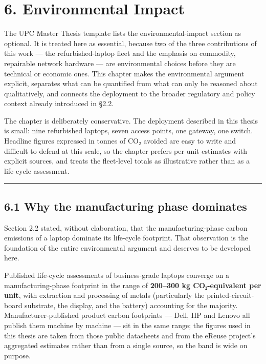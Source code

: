 \hypertarget{environmental-impact}{%
\section{6. Environmental Impact}\label{environmental-impact}}

The UPC Master Thesis template lists the environmental-impact section as
optional. It is treated here as essential, because two of the three
contributions of this work --- the refurbished-laptop fleet and the
emphasis on commodity, repairable network hardware --- are environmental
choices before they are technical or economic ones. This chapter makes
the environmental argument explicit, separates what can be quantified
from what can only be reasoned about qualitatively, and connects the
deployment to the broader regulatory and policy context already
introduced in §2.2.

The chapter is deliberately conservative. The deployment described in
this thesis is small: nine refurbished laptops, seven access points, one
gateway, one switch. Headline figures expressed in tonnes of CO₂ avoided
are easy to write and difficult to defend at this scale, so the chapter
prefers per-unit estimates with explicit sources, and treats the
fleet-level totals as illustrative rather than as a life-cycle
assessment.

\begin{center}\rule{0.5\linewidth}{0.5pt}\end{center}

\hypertarget{why-the-manufacturing-phase-dominates}{%
\subsection{6.1 Why the manufacturing phase
dominates}\label{why-the-manufacturing-phase-dominates}}

Section 2.2 stated, without elaboration, that the manufacturing-phase
carbon emissions of a laptop dominate its life-cycle footprint. That
observation is the foundation of the entire environmental argument and
deserves to be developed here.

Published life-cycle assessments of business-grade laptops converge on a
manufacturing-phase footprint in the range of \textbf{200--300 kg
CO₂-equivalent per unit}, with extraction and processing of metals
(particularly the printed-circuit-board substrate, the display, and the
battery) accounting for the majority. Manufacturer-published product
carbon footprints --- Dell, HP and Lenovo all publish them machine by
machine --- sit in the same range; the figures used in this thesis are
taken from those public datasheets and from the eReuse project's
aggregated estimates rather than from a single source, so the band is
wide on purpose.

